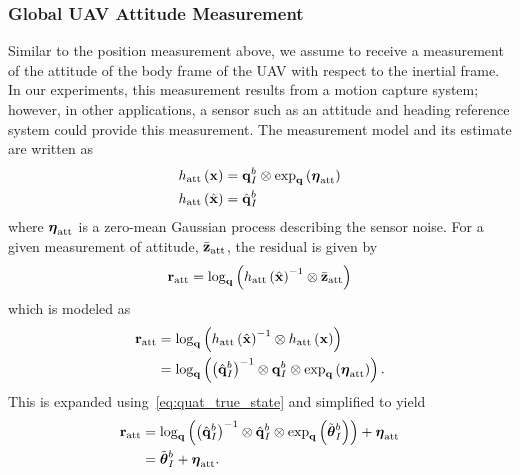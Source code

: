 \subsubsection{Global UAV Attitude Measurement}
Similar to the position measurement above, we assume to receive a measurement of
the attitude of the body frame of the UAV with respect to the inertial frame.
In our experiments, this measurement results from a motion capture system;
however, in other applications, a sensor such as an attitude and heading
reference system could provide this measurement.
The measurement model and its estimate are
written as
\begin{align}
  h_{\text{att}} \left( \boldsymbol{\mathrm{x}} \right) &= \boldsymbol{\mathrm{q}}_{I}^b \otimes \exp_{\boldsymbol{\mathrm{q}}} \left(
  \boldsymbol{\mathrm{\eta}}_{\text{att}} \right) \\
    h_{\text{att}} \left( \hat{\boldsymbol{\mathrm{x}}} \right) &= \hat{\boldsymbol{\mathrm{q}}}_{I}^b
\end{align}
where $\boldsymbol{\mathrm{\eta}}_{\text{att}}$ is a zero-mean Gaussian process
describing the sensor noise.
For a given measurement of attitude, $\bar{\boldsymbol{\mathrm{z}}}_{\text{att}}$, the residual is
given by
\begin{equation}
  \boldsymbol{\mathrm{r}}_{\text{att}} = \log_{\boldsymbol{\mathrm{q}}} \left(  h_{\text{att}} \left(
  \hat{\boldsymbol{\mathrm{x}}} \right)^{-1} \otimes \bar{\boldsymbol{\mathrm{z}}}_{\text{att}} \right)
\end{equation}
which is modeled as
\begin{align}
  \boldsymbol{\mathrm{r}}_{\text{att}} &= \log_{\boldsymbol{\mathrm{q}}} \left(  h_{\text{att}} \left(
  \hat{\boldsymbol{\mathrm{x}}} \right)^{-1} \otimes h_{\text{att}} \left( \boldsymbol{\mathrm{x}} \right) \right) \\
                        &= \log_{\boldsymbol{\mathrm{q}}} \left(  \left(
  \hat{\boldsymbol{\mathrm{q}}}_{I}^b \right)^{-1} \otimes \boldsymbol{\mathrm{q}}_{I}^b \otimes \exp_{\boldsymbol{\mathrm{q}}} \left(
  \boldsymbol{\mathrm{\eta}}_{\text{att}} \right)\right).
\end{align}
This is expanded using~\eqref{eq:quat_true_state} and simplified to yield
\begin{align}
  \boldsymbol{\mathrm{r}}_{\text{att}}
                        &= \log_{\boldsymbol{\mathrm{q}}} \left(  \left(
                        \hat{\boldsymbol{\mathrm{q}}}_{I}^b \right)^{-1} \otimes
                        \hat{\boldsymbol{\mathrm{q}}}_{I}^b \otimes \exp_{\boldsymbol{\mathrm{q}}} \left(
                      \tilde{\boldsymbol{\mathrm{\theta}}}_I^b \right) \right)
                          + \boldsymbol{\mathrm{\eta}}_{\text{att}}  \\
                        &= \tilde{\boldsymbol{\mathrm{\theta}}}_I^b
                          + \boldsymbol{\mathrm{\eta}}_{\text{att}}. 
\end{align}
